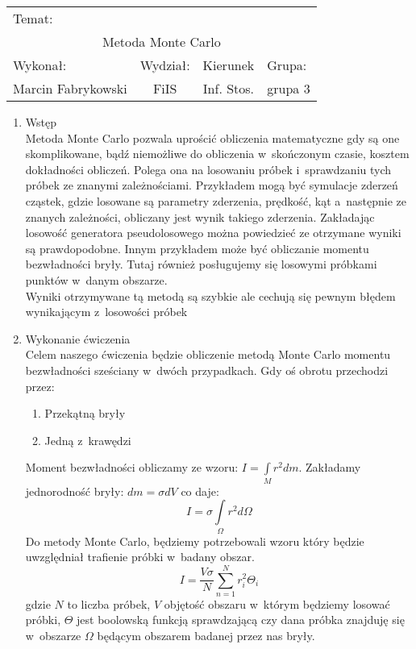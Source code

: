 \documentclass[10pt,a4paper]{article}
\begin{document}
 
\large
\begin{tabular}{|c|c|c|c|}
\hline
\multicolumn{4}{|l|}{Temat:}\\
\multicolumn{4}{|c|}{Metoda Monte Carlo}\\
\hline
\multicolumn{1}{|l}{Wykonał:}&\multicolumn{1}{|l}{Wydział:}&\multicolumn{1}{|c}{Kierunek}&\multicolumn{1}{|l|}{Grupa:}\\
Marcin Fabrykowski&FiIS&Inf. Stos.&grupa 3\\
\hline
\end{tabular}
\normalsize
\vspace{2cm}
\begin{enumerate}
\item Wstęp\\
Metoda Monte Carlo pozwala uprościć obliczenia matematyczne gdy są one skomplikowane, bądź niemożliwe do obliczenia w~skończonym czasie, kosztem dokładności obliczeń. Polega ona na losowaniu próbek i~sprawdzaniu tych próbek ze znanymi zależnościami. Przykładem mogą być symulacje zderzeń cząstek, gdzie losowane są parametry zderzenia, prędkość, kąt a~następnie ze znanych zależności, obliczany jest wynik takiego zderzenia. Zakładając losowość generatora pseudolosowego można powiedzieć ze otrzymane wyniki są prawdopodobne. Innym przykładem może być obliczanie momentu bezwładności bryły. Tutaj również posługujemy się losowymi próbkami punktów w~danym obszarze.\\
Wyniki otrzymywane tą metodą są szybkie ale cechują się pewnym błędem wynikającym z~losowości próbek
\item Wykonanie ćwiczenia\\
Celem naszego ćwiczenia będzie obliczenie metodą Monte Carlo momentu bezwładności sześciany w~dwóch przypadkach. Gdy oś obrotu przechodzi przez:
\begin{enumerate}
\item Przekątną bryły
\item Jedną z~krawędzi
\end{enumerate}
Moment bezwładności obliczamy ze wzoru: $I=\int\limits_Mr^2dm$. Zakładamy jednorodność bryły: $dm=\sigma dV$ co daje:
$$I=\sigma \int\limits_\Omega r^2d\Omega$$
Do metody Monte Carlo, będziemy potrzebowali wzoru który będzie uwzględniał trafienie próbki w~badany obszar.
$$I=\dfrac{V\sigma}{N}\sum\limits_{n=1}^Nr_i^2\Theta_i$$
gdzie $N$ to liczba próbek, $V$ objętość obszaru w~którym będziemy losować próbki, $\Theta$ jest boolowską funkcją sprawdzającą czy dana próbka znajduję się w~obszarze $\Omega$ będącym obszarem badanej przez nas bryły.\\

\end{enumerate}
\end{document}
